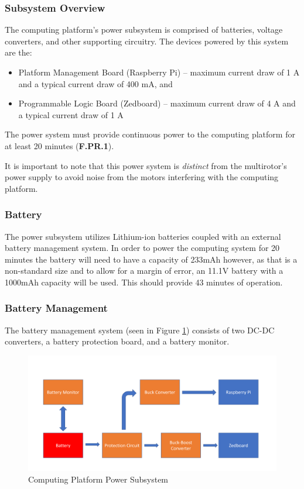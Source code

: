 \subsubsection{Subsystem Overview}
The computing platform's power subsystem is comprised of batteries, voltage converters, and other supporting circuitry. The devices powered by this system are the:

\begin{itemize}
\item Platform Management Board (Raspberry Pi) -- maximum current draw of 1 A and a typical current draw of 400 mA, and
\item Programmable Logic Board (Zedboard) -- maximum current draw of 4 A and a typical current draw of 1 A
\end{itemize}

The power system must provide continuous power to the computing platform for at least 20 minutes (\textbf{F.PR.1}).

It is important to note that this power system is \textit{distinct} from the multirotor's power supply to avoid noise from the motors interfering with the computing platform. 

\subsubsection{Battery}
The power subsystem utilizes Lithium-ion batteries coupled with an external battery management system. In order to
power the computing system for 20 minutes the battery will need to have a capacity of 233mAh however, as that is a non-standard size and to allow for a margin of error, an 11.1V battery with a 1000mAh capacity will be used. This should provide 43 minutes of operation.

\subsubsection{Battery Management}
 
The battery management system (seen in Figure \ref{powerdiag}) consists of two DC-DC converters, a battery protection board, and a battery monitor. 

\begin{figure}[H]
\centering
\includegraphics[width=15cm]{img/Power_Diagram.png}
\caption{Computing Platform Power Subsystem}
\label{powerdiag}
\end{figure}

